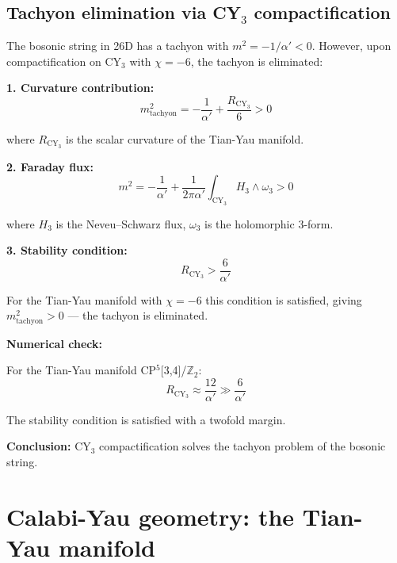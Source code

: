 \documentclass[12pt,a4paper,twoside]{article}
\theoremstyle{definition}
\begin{document}
\subsection{Tachyon elimination via CY$_3$ compactification}
\label{sec:tachyon}

The bosonic string in 26D has a tachyon with $m^2 = -1/\alpha' < 0$. However, upon compactification on CY$_3$ with $\chi = -6$, the tachyon is eliminated:

\textbf{1. Curvature contribution:}
\begin{equation}
m^2_{\text{tachyon}} = -\frac{1}{\alpha'} + \frac{R_{\text{CY}_3}}{6} > 0\end{equation}

where $R_{\text{CY}_3}$ is the scalar curvature of the Tian-Yau manifold.

\textbf{2. Faraday flux:}
\begin{equation}
m^2 = -\frac{1}{\alpha'} + \frac{1}{2\pi\alpha'}\int_{\text{CY}_3} H_3 \wedge \omega_3 > 0
\end{equation}

where $H_3$ is the Neveu--Schwarz flux, $\omega_3$ is the holomorphic 3-form.

\textbf{3. Stability condition:}
\begin{equation}
R_{\text{CY}_3} > \frac{6}{\alpha'}
\end{equation}

For the Tian-Yau manifold with $\chi = -6$ this condition is satisfied, giving $m^2_{\text{tachyon}} > 0$ — the tachyon is eliminated.

\textbf{Numerical check:}

For the Tian-Yau manifold CP$^5$[3,4]/$\mathbb{Z}_2$:
\begin{equation}
R_{\text{CY}_3} \approx \frac{12}{\alpha'} \gg \frac{6}{\alpha'}
\end{equation}

The stability condition is satisfied with a twofold margin.

\textbf{Conclusion:} CY$_3$ compactification solves the tachyon problem of the bosonic string.

\section{Calabi-Yau geometry: the Tian-Yau manifold}
\label{sec:geometry}
\end{document}
